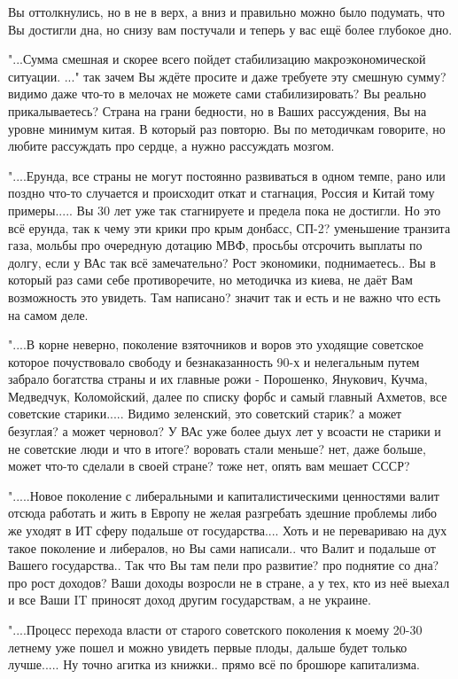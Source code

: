 \begin{itemize}
\begin{itemize}
 Вы оттолкнулись, но в не в верх, а вниз и правильно можно было подумать, что
 Вы достигли дна, но снизу вам постучали и теперь у вас ещё более глубокое дно.

"...Сумма смешная и скорее всего пойдет стабилизацию макроэкономической
ситуации. ..." так зачем Вы ждёте просите и даже требуете эту смешную сумму?
видимо даже что-то в мелочах не можете сами стабилизировать? Вы реально
прикалываетесь? Страна на грани бедности, но в Ваших рассуждения, Вы на уровне
минимум китая. В который раз повторю. Вы по методичкам говорите, но любите
рассуждать про сердце, а нужно рассуждать мозгом.

"....Ерунда, все страны не могут постоянно развиваться в одном темпе, рано или
поздно что-то случается и происходит откат и стагнация, Россия и Китай тому
примеры..... Вы 30 лет уже так стагнируете и предела пока не достигли. Но это
всё ерунда, так к чему эти крики про крым донбасс, СП-2? уменьшение транзита
газа, мольбы про очередную дотацию МВФ, просьбы отсрочить выплаты по долгу,
если у ВАс так всё замечательно? Рост экономики, поднимаетесь.. Вы в который
раз сами себе противоречите, но методичка из киева, не даёт Вам возможность это
увидеть. Там написано? значит так и есть и не важно что есть на самом деле.

"....В корне неверно, поколение взяточников и воров это уходящие советское
которое почуствовало свободу и безнаказанность 90-х и нелегальным путем забрало
богатства страны и их главные рожи - Порошенко, Янукович, Кучма, Медведчук,
Коломойский, далее по списку форбс и самый главный Ахметов, все советские
старики..... Видимо зеленский, это советский старик? а может безуглая? а может
черновол? У ВАс уже более дыух лет у всоасти не старики и не советские люди и
что в итоге? воровать стали меньше? нет, даже больше, может что-то сделали в
своей стране? тоже нет, опять вам мешает СССР?

".....Новое поколение с либеральными и капиталистическими ценностями валит
отсюда работать и жить в Европу не желая разгребать здешние проблемы либо же
уходят в ИТ сферу подальше от государства.... Хоть и не перевариваю на дух
такое поколение и либералов, но Вы сами написали.. что Валит и подальше от
Вашего государства.. Так что Вы там пели про развитие? про поднятие со дна? про
рост доходов? Ваши доходы возросли не в стране, а у тех, кто из неё выехал и
все Ваши IT приносят доход другим государствам, а не украине.

"....Процесс перехода власти от старого советского поколения к моему 20-30
летнему уже пошел и можно увидеть первые плоды, дальше будет только лучше.....
Ну точно агитка из книжки.. прямо всё по брошюре капитализма.


\end{itemize}
\end{itemize}
